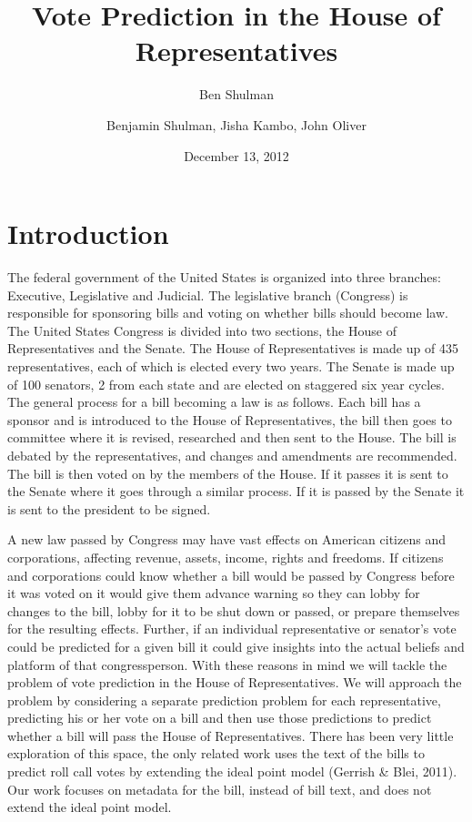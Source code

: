 \documentclass[11pt,letterpaper,twocolumn]{article}
\author{Ben Shulman}
\begin{document}
\title{Vote Prediction in the House of Representatives}
\author{Benjamin Shulman, Jisha Kambo, John Oliver}
\date{December 13, 2012}
\maketitle

\section{Introduction}
The federal government of the United States is organized into three branches: Executive, Legislative and Judicial. The legislative branch (Congress) is responsible for sponsoring bills and voting on whether bills should become law. The United States Congress is divided into two sections, the House of Representatives and the Senate. The House of Representatives is made up of 435 representatives, each of which is elected every two years. The Senate is made up of 100 senators, 2 from each state and are elected on staggered six year cycles. The general process for a bill becoming a law is as follows. Each bill has a sponsor and is introduced to the House of Representatives, the bill then goes to committee where it is revised, researched and then sent to the House. The bill is debated by the representatives, and changes and amendments are recommended. The bill is then voted on by the members of the House. If it passes it is sent to the Senate where it goes through a similar process. If it is passed by the Senate it is sent to the president to be signed.

	A new law passed by Congress may have vast effects on American citizens and corporations, affecting revenue, assets, income, rights and freedoms. If citizens and corporations could know whether a bill would be passed by Congress before it was voted on it would give them advance warning so they can lobby for changes to the bill, lobby for it to be shut down or passed, or prepare themselves for the resulting effects. Further, if an individual representative or senator's vote could be predicted for a given bill it could give insights into the actual beliefs and platform of that congressperson. With these reasons in mind we will tackle the problem of vote prediction in the House of Representatives. We will approach the problem by considering a separate prediction problem for each representative, predicting his or her vote on a bill and then use those predictions to predict whether a bill will pass the House of Representatives. There has been very little exploration of this space, the only related work uses the text of the bills to predict roll call votes by extending the ideal point model (Gerrish \& Blei, 2011). Our work focuses on metadata for the bill, instead of bill text, and does not extend the ideal point model.
\end{document}
